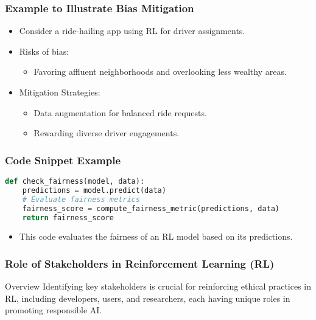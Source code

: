 \documentclass[aspectratio=169]{beamer}
\begin{document}
\begin{frame}[fragile]
    \frametitle{Example to Illustrate Bias Mitigation}
    \begin{itemize}
        \item Consider a ride-hailing app using RL for driver assignments.
        \item Risks of bias:
        \begin{itemize}
            \item Favoring affluent neighborhoods and overlooking less wealthy areas.
        \end{itemize}
        \item Mitigation Strategies:
        \begin{itemize}
            \item Data augmentation for balanced ride requests.
            \item Rewarding diverse driver engagements.
        \end{itemize}
    \end{itemize}
\end{frame}

\begin{frame}[fragile]
    \frametitle{Code Snippet Example}
    \begin{lstlisting}[language=Python]
def check_fairness(model, data):
    predictions = model.predict(data)
    # Evaluate fairness metrics
    fairness_score = compute_fairness_metric(predictions, data)
    return fairness_score
    \end{lstlisting}
    \begin{itemize}
        \item This code evaluates the fairness of an RL model based on its predictions.
    \end{itemize}
\end{frame}

\begin{frame}[fragile]
    \frametitle{Role of Stakeholders in Reinforcement Learning (RL)}
    \begin{block}{Overview}
        Identifying key stakeholders is crucial for reinforcing ethical practices in RL, including developers, users, and researchers, each having unique roles in promoting responsible AI.
    \end{block}
\end{frame}
\end{document}

